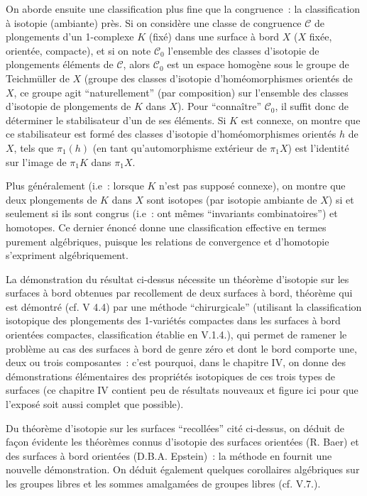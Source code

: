 On aborde ensuite une classification plus fine que la congruence~: la classification à isotopie (ambiante) près. Si on considère une classe de congruence $\mathcal{C}$ de plongements d'un 1-complexe $K$ (fixé) dans une surface à bord $X$ ($X$ fixée, orientée, compacte), et si on note $\mathcal{C}_0$ l'ensemble des classes d'isotopie de plongements éléments de $\mathcal{C}$, alors $\mathcal{C}_0$ est un espace homogène sous le groupe de Teichmüller de $X$ (groupe des classes d'isotopie d'homéomorphismes orientés de $X$, ce groupe agit ``naturellement'' (par composition) sur l'ensemble des classes d'isotopie de plongements de $K$ dans $X$). Pour ``connaître'' $\mathcal{C}_0$, il suffit donc de déterminer le stabilisateur d'un de ses éléments. Si $K$ est connexe, on montre que ce stabilisateur est formé des classes d'isotopie d'homéomorphismes orientés $h$ de $X$, tels que $\pi_1(h)$ (en tant qu'automorphisme extérieur de $\pi_1 X$) est l'identité sur l'image de $\pi_1 K$ dans $\pi_1 X$.

Plus généralement (i.e~: lorsque $K$ n'est pas supposé connexe), on montre que deux plongements de $K$ dans $X$ sont isotopes (par isotopie ambiante de $X$) si et seulement si ils sont congrus (i.e~: ont mêmes ``invariants combinatoires'') et homotopes. Ce dernier énoncé donne une classification effective en termes purement algébriques, puisque les relations de convergence et d'homotopie s'expriment algébriquement.

La démonstration du résultat ci-dessus nécessite un théorème d'isotopie sur les surfaces à bord obtenues par recollement de deux surfaces à bord, théorème qui est démontré (cf. V 4.4) par une méthode ``chirurgicale'' (utilisant la classification isotopique des plongements des 1-variétés compactes dans les surfaces à bord orientées compactes, classification établie en V.1.4.), qui permet de ramener le problème au cas des surfaces à bord de genre zéro et dont le bord comporte une, deux ou trois composantes~: c'est pourquoi, dans le chapitre IV, on donne des démonstrations élémentaires des propriétés isotopiques de ces trois types de surfaces (ce chapitre IV contient peu de résultats nouveaux et figure ici pour que l'exposé soit aussi complet que possible).

Du théorème d'isotopie sur les surfaces ``recollées'' cité ci-dessus, on déduit de façon évidente les théorèmes connus d'isotopie des surfaces orientées (R. Baer) et des surfaces à bord orientées (D.B.A. Epstein)~: la méthode en fournit une nouvelle démonstration. On déduit également quelques corollaires algébriques sur les groupes libres et les sommes amalgamées de groupes libres (cf. V.7.).

